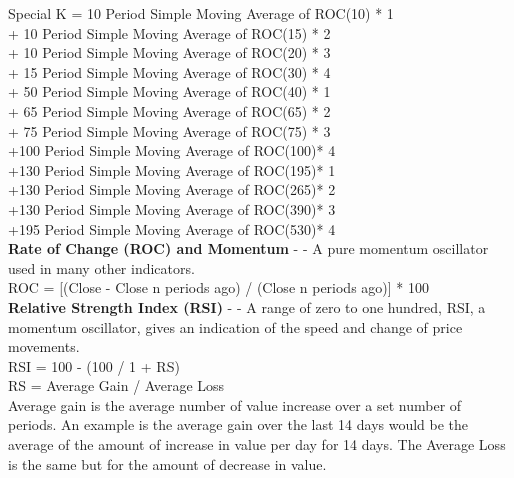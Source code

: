 \documentclass[conference]{IEEEtran}
\begin{document}
\noindent
Special K = 10 Period Simple Moving Average of ROC(10) * 1 \\
            + 10 Period Simple Moving Average of ROC(15) * 2 \\
            + 10 Period Simple Moving Average of ROC(20) * 3 \\
            + 15 Period Simple Moving Average of ROC(30) * 4 \\
            + 50 Period Simple Moving Average of ROC(40) * 1 \\
            + 65 Period Simple Moving Average of ROC(65) * 2 \\
            + 75 Period Simple Moving Average of ROC(75) * 3 \\
            +100 Period Simple Moving Average of ROC(100)* 4 \\
            +130 Period Simple Moving Average of ROC(195)* 1 \\
            +130 Period Simple Moving Average of ROC(265)* 2 \\
            +130 Period Simple Moving Average of ROC(390)* 3 \\
            +195 Period Simple Moving Average of ROC(530)* 4 \\

\noindent
\textbf{Rate of Change (ROC) and Momentum} - \cite{Murphy1999} - A pure momentum oscillator used in many other indicators.\\

\noindent
ROC = [(Close - Close n periods ago) / (Close n periods ago)] * 100 \\

\noindent
\textbf{Relative Strength Index (RSI)} - \cite{Wilder1978} - A range of zero to one hundred, RSI, a momentum oscillator, gives an indication of the speed and change of price movements.\\

\noindent
RSI = 100 - (100 / 1 + RS) \\
RS = Average Gain / Average Loss\\

Average gain is the average number of value increase over a set number of periods. An example is the average gain over the last 14 days would be the average of the amount of increase in value per day for 14 days. The Average Loss is the same but for the amount of decrease in value.\\
\end{document}
